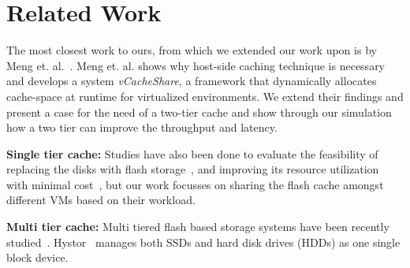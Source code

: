 %
%
%
%

\section{Related Work}

The most closest work to ours, from which we extended our work upon is by Meng et. al.~\cite{meng_vcacheshare:_2014}. Meng et. al. shows why host-side caching technique is necessary and develops a system \emph{vCacheShare}, a framework that dynamically allocates cache-space at runtime for virtualized environments. We extend their findings and present a case for the need of a two-tier cache and show through our simulation how a two tier can improve the throughput and latency.

{\bf Single tier cache:} Studies have also been done to evaluate the feasibility of replacing the disks with flash storage~\cite{narayanan_migrating_2009}, and improving its resource utilization with minimal cost~\cite{tai_improving_2015}, but our work focusses on sharing the flash cache amongst different VMs based on their workload.

{\bf Multi tier cache:} Multi tiered flash based storage systems have been recently studied~\cite{wang_balancing_2014, guerra_cost_2011, chen_hystor:_2011}. Hystor~\cite{chen_hystor:_2011} manages both SSDs and hard disk drives (HDDs) as one single block device.
